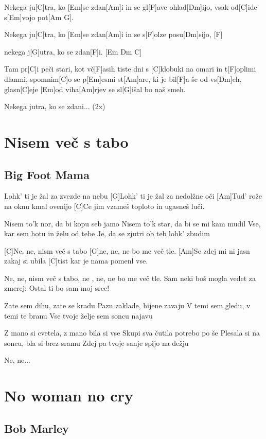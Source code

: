 \documentclass[a4paper,12pt]{article}
\begin{document}
\begin{multicols}{2}
\begin{guitar}
Nekega ju[C]tra, ko [Em]se zdan[Am]i
in se gl[F]ave ohlad[Dm]ijo,
vsak od[C]ide s[Em]vojo pot[Am G].

Nekega ju[C]tra, ko [Em]se zdan[Am]i
in se s[F]olze posu[Dm]sijo, [F]

nekega j[G]utra, ko se zdan[F]i. [Em Dm C]


Tam pr[C]i peči stari, kot vč[F]asih tiste dni
s [C]klobuki na omari in t[F]oplimi dlanmi,
spomnim[C]o se p[Em]esmi st[Am]are, ki je bil[F]a še od vs[Dm]eh,
glasn[C]eje [Em]od viha[Am]rjev se sl[G]išal bo naš smeh.


Nekega jutra, ko se zdani... (2x)


\end{guitar}
\section{Nisem več s tabo}
\subsection*{Big Foot Mama}
\begin{guitar}
[C]Lohk' ti je žal za zvezde na nebu
[G]Lohk' ti je žal za nedolžne oči
[Am]Tud' rože na oknu kmal ovenijo
[C]Ce jim vzameš toploto in ugasneš luči. 


Nisem to'k nor, da bi kopu seb jamo
Nisem to'k star, da bi se mi kam mudil 
Vse, kar sem hotu in želu od tebe
Je, da se zjutri ob teb lohk' zbudim


[C]Ne, ne, nism več s tabo
[G]ne, ne, ne bo me več tle.
[Am]Se zdej mi ni jasn zakaj si ubila
[C]tist kar je nama pomenl vse.


Ne, ne, nism več s tabo,
ne , ne, ne bo me več tle.
Sam neki boš mogla vedet za zmerej:
Ostal ti bo sam moj srce!


Zate sem dihu, zate se kradu
Pazu zaklade, hijene zavaju
V temi sem gledu, v temi te branu
Vse tvoje želje sem soncu najavu


Z mano si cvetela, z mano bila si vse
Skupi sva čutila  potrebo po še
Plesala si na soncu, bla si brez sramu
Zdej pa tvoje sanje spijo na dežju


Ne, ne... 

\end{guitar}
\section{No woman no cry}
\subsection*{Bob Marley}
\begin{guitar}


\end{guitar}
\end{multicols}
\end{document}
